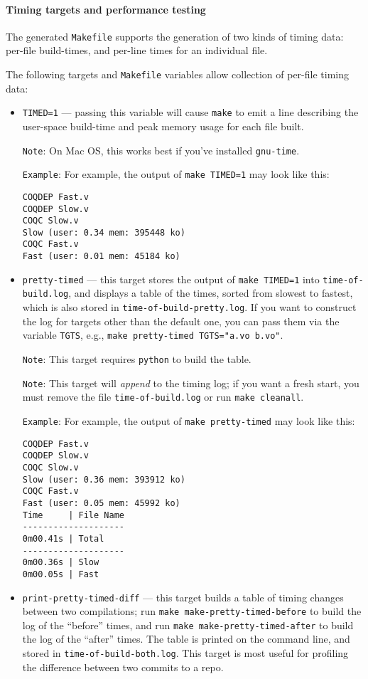 \paragraph{Timing targets and performance testing} %
The generated \texttt{Makefile} supports the generation of two kinds
of timing data: per-file build-times, and per-line times for an
individual file.

The following targets and \texttt{Makefile} variables allow collection
of per-file timing data:
\begin{itemize}
\item \texttt{TIMED=1} --- passing this variable will cause
  \texttt{make} to emit a line describing the user-space build-time
  and peak memory usage for each file built.

  \texttt{Note}: On Mac OS, this works best if you've installed
  \texttt{gnu-time}.

  \texttt{Example}: For example, the output of \texttt{make TIMED=1}
  may look like this:
\begin{verbatim}
COQDEP Fast.v
COQDEP Slow.v
COQC Slow.v
Slow (user: 0.34 mem: 395448 ko)
COQC Fast.v
Fast (user: 0.01 mem: 45184 ko)
\end{verbatim}
\item \texttt{pretty-timed} --- this target stores the output of
  \texttt{make TIMED=1} into \texttt{time-of-build.log}, and displays
  a table of the times, sorted from slowest to fastest, which is also
  stored in \texttt{time-of-build-pretty.log}.  If you want to
  construct the log for targets other than the default one, you can
  pass them via the variable \texttt{TGTS}, e.g., \texttt{make
    pretty-timed TGTS="a.vo b.vo"}.

  \texttt{Note}: This target requires \texttt{python} to build the table.

  \texttt{Note}: This target will \emph{append} to the timing log; if
  you want a fresh start, you must remove the file
  \texttt{time-of-build.log} or run \texttt{make cleanall}.

  \texttt{Example}: For example, the output of \texttt{make
    pretty-timed} may look like this:
\begin{verbatim}
COQDEP Fast.v
COQDEP Slow.v
COQC Slow.v
Slow (user: 0.36 mem: 393912 ko)
COQC Fast.v
Fast (user: 0.05 mem: 45992 ko)
Time     | File Name
--------------------
0m00.41s | Total
--------------------
0m00.36s | Slow
0m00.05s | Fast
\end{verbatim}
\item \texttt{print-pretty-timed-diff} --- this target builds a table
  of timing changes between two compilations; run \texttt{make
    make-pretty-timed-before} to build the log of the ``before''
  times, and run \texttt{make make-pretty-timed-after} to build the
  log of the ``after'' times.  The table is printed on the command
  line, and stored in \texttt{time-of-build-both.log}.  This target is
  most useful for profiling the difference between two commits to a
  repo.


\end{itemize}
